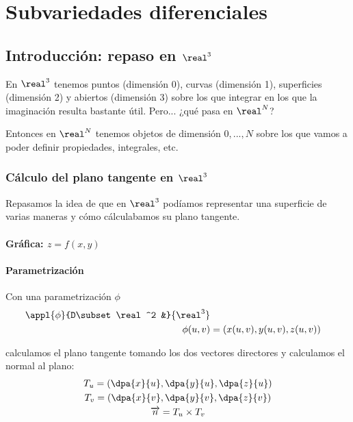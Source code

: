 \section{Subvariedades diferenciales}
  
  \subsection{Introducción: repaso en $\real^3$}
  
  En $\real^3$ tenemos puntos (dimensión 0), curvas (dimensión 1), superficies (dimensión 2) y abiertos (dimensión 3) sobre los que integrar en los que la imaginación resulta bastante útil. Pero... ¿qué pasa en $\real^N$? 
  
  Entonces en $\real^N$ tenemos objetos de dimensión $0,...,N$ sobre los que vamos a poder definir propiedades, integrales, etc.
  
\subsubsection{Cálculo del plano tangente en $\real^3$}  
  
  Repasamos la idea de que en $\real^3$ podíamos representar una superficie de varias maneras y cómo cálculabamos su plano tangente.
  \paragraph{Gráfica: $z=f(x,y)$}
	
  
  \paragraph{Parametrización}  Con una parametrización $\phi$ 
   	 \begin{align*}
  	 	\appl{\phi}{D\subset\real^2 &}{\real^3} \\     
     	\phi(u,v) &= (x(u,v),y(u,v),z(u,v))
     \end{align*}
  
     calculamos el plano tangente tomando los dos vectores directores y calculamos el normal al plano:
     \begin{gather*}
      	T_u = \left( \dpa{x}{u},\dpa{y}{u},\dpa{z}{u}\right)\\
      	T_v = \left( \dpa{x}{v},\dpa{y}{v},\dpa{z}{v}\right)\\
      	\overrightarrow{n} = T_u\times T_v\\
     \end{gather*}

